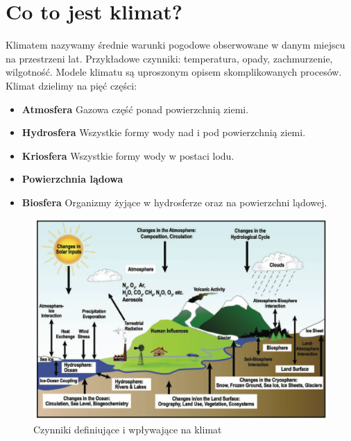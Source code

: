 \documentclass{article}
\theoremstyle{plain}
\begin{document}
\section{Co to jest klimat?}
Klimatem nazywamy średnie warunki pogodowe obserwowane w danym miejscu na przestrzeni lat. Przykładowe czynniki: temperatura, opady, zachmurzenie, wilgotność.
Modele klimatu są uproszonym opisem skomplikowanych procesów.
Klimat dzielimy na pięć części:
\begin{itemize}
	\item \textbf{Atmosfera} Gazowa część ponad powierzchnią ziemi.
	\item \textbf{Hydrosfera} Wszystkie formy wody nad i pod powierzchnią ziemi. 
	\item \textbf{Kriosfera} Wszystkie formy wody w postaci lodu.
	\item \textbf{Powierzchnia lądowa}
	\item \textbf{Biosfera} Organizmy żyjące w hydrosferze oraz na powierzchni lądowej.
\end{itemize}
\begin{figure}[h]
\begin{center}
\includegraphics[width=0.7\linewidth]{images/Figure1}
\caption{Czynniki definiujące i wpływające na klimat}
\end{center}

\end{figure}
\end{document}
